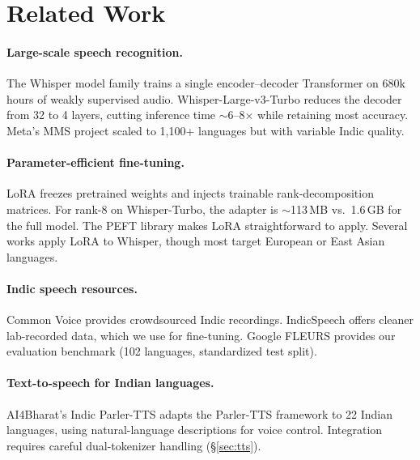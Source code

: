\documentclass[11pt]{article}
\begin{document}
\section{Related Work}

\paragraph{Large-scale speech recognition.}
The Whisper model family \citep{radford2023whisper} trains a single encoder--decoder Transformer on 680k hours of weakly supervised audio.  Whisper-Large-v3-Turbo \citep{openai_whisper_turbo} reduces the decoder from 32 to 4 layers, cutting inference time $\sim$6--8$\times$ while retaining most accuracy.  Meta's MMS project \citep{pratap2023mms} scaled to 1,100+ languages but with variable Indic quality.

\paragraph{Parameter-efficient fine-tuning.}
LoRA \citep{hu2022lora} freezes pretrained weights and injects trainable rank-decomposition matrices.  For rank-8 on Whisper-Turbo, the adapter is $\sim$113\,MB vs.\ 1.6\,GB for the full model.  The PEFT library \citep{peft2023} makes LoRA straightforward to apply.  Several works apply LoRA to Whisper, though most target European or East Asian languages.

\paragraph{Indic speech resources.}
Common Voice \citep{commonvoice2020} provides crowdsourced Indic recordings.  IndicSpeech \citep{indicspeech2022} offers cleaner lab-recorded data, which we use for fine-tuning.  Google FLEURS \citep{conneau2023fleurs} provides our evaluation benchmark (102 languages, standardized test split).

\paragraph{Text-to-speech for Indian languages.}
AI4Bharat's Indic Parler-TTS \citep{ai4bharat_indic_parler} adapts the Parler-TTS framework \citep{lyth2024parlertts} to 22 Indian languages, using natural-language descriptions for voice control.  Integration requires careful dual-tokenizer handling (\S\ref{sec:tts}).
\end{document}
